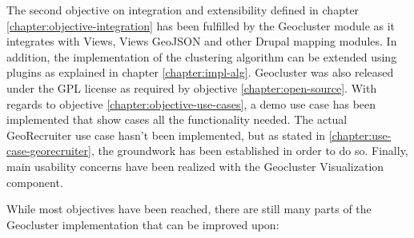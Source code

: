 The second objective on integration and extensibility defined in chapter \ref{chapter:objective-integration} has been fulfilled by the Geocluster module as it integrates with Views, Views GeoJSON and other Drupal mapping modules. In addition, the implementation of the clustering algorithm can be extended using plugins as explained in chapter \ref{chapter:impl-alg}. Geocluster was also released under the GPL license as required by objective \ref{chapter:open-source}. With regards to objective \ref{chapter:objective-use-cases}, a demo use case has been implemented that show cases all the functionality needed. The actual GeoRecruiter use case hasn't been implemented, but as stated in \ref{chapter:use-case-georecruiter}, the groundwork has been established in order to do so. Finally, main usability concerns have been realized with the Geocluster Visualization component.

While most objectives have been reached, there are still many parts of the Geocluster implementation that can be improved upon:

